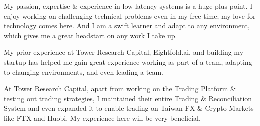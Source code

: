 \documentclass[11pt, a4paper]{awesome-cv}
\begin{document}
\begin{cvletter}
My passion, expertise \& experience in low latency systems is a huge plus point. I enjoy working on challenging technical problems even in my free time; my love for technology comes here. And I am a swift learner and adapt to any environment, which gives me a great headstart on any work I take up.

My prior experience at Tower Research Capital, Eightfold.ai, and building my startup has helped me gain great experience working as part of a team, adapting to changing environments, and even leading a team.

At Tower Research Capital, apart from working on the Trading Platform \& testing out trading strategies, I maintained their entire Trading \& Reconciliation System and even expanded it to enable trading on Taiwan FX \& Crypto Markets like FTX and Huobi. My experience here will be very beneficial.

\end{cvletter}


\makeletterclosing
\end{document}
